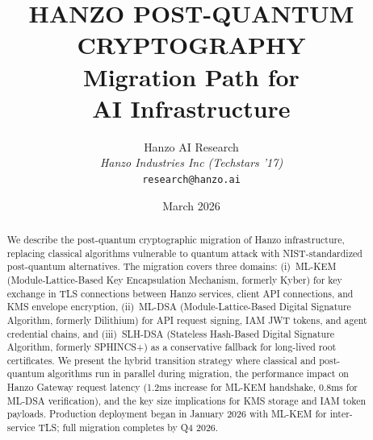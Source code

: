 \documentclass[11pt]{article}
\title{HANZO POST-QUANTUM CRYPTOGRAPHY\\[0.3em]
{\large Migration Path for\\AI Infrastructure}}
\author{
    Hanzo AI Research \\
    \textit{Hanzo Industries Inc (Techstars '17)} \\
    \texttt{research@hanzo.ai}
}
\date{March 2026}
\begin{document}
\hanzocoverpage

\begin{abstract}
We describe the post-quantum cryptographic migration of Hanzo infrastructure,
replacing classical algorithms vulnerable to quantum attack with NIST-standardized
post-quantum alternatives. The migration covers three domains: (i)~ML-KEM
(Module-Lattice-Based Key Encapsulation Mechanism, formerly Kyber) for key
exchange in TLS connections between Hanzo services, client API connections, and
KMS envelope encryption, (ii)~ML-DSA (Module-Lattice-Based Digital Signature
Algorithm, formerly Dilithium) for API request signing, IAM JWT tokens, and
agent credential chains, and (iii)~SLH-DSA (Stateless Hash-Based Digital
Signature Algorithm, formerly SPHINCS+) as a conservative fallback for
long-lived root certificates. We present the hybrid transition strategy where
classical and post-quantum algorithms run in parallel during migration, the
performance impact on Hanzo Gateway request latency (1.2ms increase for ML-KEM
handshake, 0.8ms for ML-DSA verification), and the key size implications for
KMS storage and IAM token payloads. Production deployment began in January 2026
with ML-KEM for inter-service TLS; full migration completes by Q4 2026.
\end{abstract}












\end{document}
